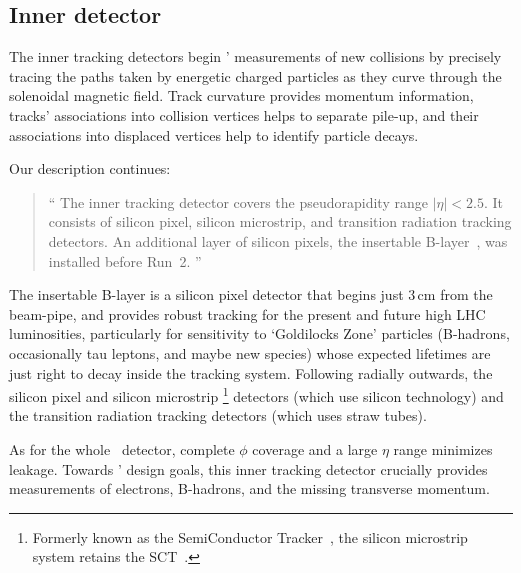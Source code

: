 

\subsection{Inner detector}
\label{sec:atlas_inner}
The inner tracking detectors begin \atlas' measurements of new collisions
by precisely tracing the paths taken by energetic charged particles
as they curve through the solenoidal magnetic field.
Track curvature provides momentum information,
tracks' associations into collision vertices helps to separate
pile-up,
and their associations into displaced vertices help to identify
particle decays.

Our description continues:
\begin{quote}
``%
The inner tracking detector covers the pseudorapidity range $|\eta| < 2.5$.
It consists of silicon pixel, silicon microstrip, and transition radiation
tracking detectors.
An additional layer of silicon pixels, the insertable
B-layer~\cite{ATLAS-TDR-19, PIX-2018-001}, was installed before Run~2.%
''~\cite{atlas2022searches}
\end{quote}
The insertable B-layer is a silicon pixel detector that begins just
$3\,\textrm{cm}$ from the beam-pipe, and provides robust tracking for the
present and future high LHC luminosities,
particularly for sensitivity to `Goldilocks Zone' particles
(B-hadrons, occasionally tau leptons, and maybe new species) whose expected
lifetimes are just right to decay inside the tracking system.
Following radially outwards, the silicon pixel and silicon microstrip%
\footnote{%
Formerly known as the SemiConductor Tracker~\cite{atlas1999design1},
the silicon microstrip system retains the
SCT~\cite{atlas2008experiment}.%
}
detectors (which use silicon technology)
and the transition radiation tracking detectors (which uses straw tubes).

As for the whole \atlas\ detector, complete $\phi$ coverage and a large $\eta$
range minimizes leakage.
Towards \atlas' design goals, this inner tracking detector crucially provides
measurements of electrons, B-hadrons, and the missing transverse momentum.


